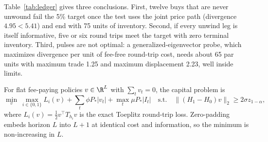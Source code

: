 Table~\ref{tab:ledger} gives three conclusions. First, twelve buys that are never unwound fail the 5\% target once the test uses the joint price path (divergence $4.95<5.41$) and end with 75 units of inventory. Second, if every unwind leg is itself informative, five or six round trips meet the target with zero terminal inventory. Third, pulses are not optimal: a generalized-eigenvector probe, which maximizes divergence per unit of fee-free round-trip cost, needs about 65 par units with maximum trade 1.25 and maximum displacement 2.23, well inside limits.

For flat fee-paying policies $v\in\R^L$ with $\sum_tv_t=0$, the capital problem is
\begin{equation}\label{eq:capprob}
\min_v\ \max_{i\in\{0,1\}}L_i(v)+\sum_t\phi P_*|v_t|+\max_t\mu P_*|I_t|\quad\text{s.t.}\quad\|(H_1-H_0)v\|_2\ge2\sigma z_{1-\alpha},
\end{equation}
where $L_i(v)=\tfrac12v^\top T_{h_i}v$ is the exact Toeplitz round-trip loss. Zero-padding embeds horizon $L$ into $L+1$ at identical cost and information, so the minimum is non-increasing in $L$.

